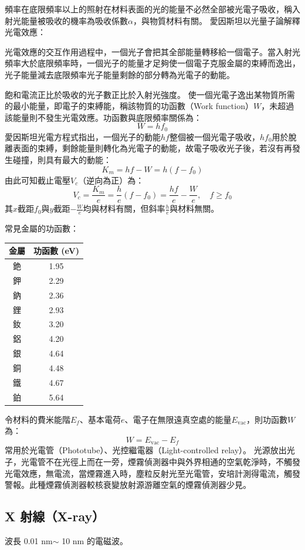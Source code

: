 \documentclass[a4paper,12pt]{article}
\begin{document}
\item 頻率在底限頻率以上的照射在材料表面的光的能量不必然全部被光電子吸收，稱入射光能量被吸收的機率為吸收係數$\alpha$，與物質材料有關。
\eit
{}
愛因斯坦以光量子論解釋光電效應：
\bit
\item 光電效應的交互作用過程中，一個光子會把其全部能量轉移給一個電子。當入射光頻率大於底限頻率時，一個光子的能量才足夠使一個電子克服金屬的束縛而逸出，光子能量減去底限頻率光子能量剩餘的部分轉為光電子的動能。
\item 飽和電流正比於吸收的光子數正比於入射光強度。
\eit
使一個光電子逸出某物質所需的最小能量，即電子的束縛能，稱該物質的功函數（Work function）$W$，未超過該能量則不發生光電效應。功函數與底限頻率關係為：
\[W= h f_0\]
愛因斯坦光電方程式指出，一個光子的動能$hf$整個被一個光電子吸收，$hf_0$用於脫離表面的束縛，剩餘能量則轉化為光電子的動能，故電子吸收光子後，若沒有再發生碰撞，則具有最大的動能：
\[K_m=hf-W=h(f-f_0)\]
由此可知截止電壓$V_c$（逆向為正）為：
\[V_c=\frac{K_m}{e}=\frac{h}{e}(f-f_0)=\frac{hf}{e}-\frac{W}{e},\quad f\geq f_0\]
其$x$截距$f_0$與$y$截距$-\frac{W}{e}$均與材料有關，但斜率$\frac{h}{e}$與材料無關。

常見金屬的功函數：
\begin{longtable}[c]{|c|c|}
\hline
金屬 & 功函數 (eV)\\\hline\endhead
銫 & 1.95\\\hline
鉀 & 2.29\\\hline
鈉 & 2.36\\\hline
鋰 & 2.93\\\hline
釹 & 3.20\\\hline
鋁 & 4.20\\\hline
銀 & 4.64\\\hline
銅 & 4.48\\\hline
鐵 & 4.67\\\hline
鉑 & 5.64\\\hline
\end{longtable}\FB
{}
令材料的費米能階$E_f$、基本電荷$e$、電子在無限遠真空處的能量$E_{\text{vac}}$，則功函數$W$為：
\[W=E_{\text{vac}}-E_f\]
常用於光電管（Phototube）、光控繼電器（Light-controlled relay）。
光源放出光子，光電管不在光徑上而在一旁，煙霧偵測器中與外界相通的空氣乾淨時，不觸發光電效應，無電流，當煙霧進入時，塵粒反射光至光電管，安培計測得電流，觸發警報。此種煙霧偵測器較核衰變放射源游離空氣的煙霧偵測器少見。
\subsection{X 射線（X-ray）}
波長 0.01 nm$\sim$ 10 nm 的電磁波。
\end{document}
